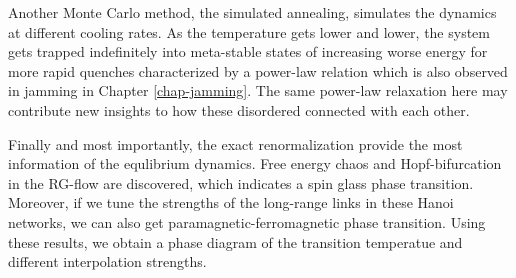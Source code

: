 Another Monte Carlo method, the simulated annealing, simulates the dynamics at different cooling rates. As the temperature gets lower and lower, the system gets trapped indefinitely into meta-stable states of increasing worse energy for more rapid quenches characterized by a power-law relation \cite{cheng2015jamming} which is also observed in jamming in Chapter \ref{chap-jamming}. The same power-law relaxation here may contribute new insights to how these disordered connected with each other.

Finally and most importantly, the exact renormalization provide the most information of the equlibrium dynamics. Free energy chaos and Hopf-bifurcation in the RG-flow are discovered, which indicates a spin glass phase transition. Moreover, if we tune the strengths of the long-range links in these Hanoi networks, we can also get paramagnetic-ferromagnetic phase transition. Using these results, we obtain a phase diagram of the transition temperatue and different interpolation strengths.

